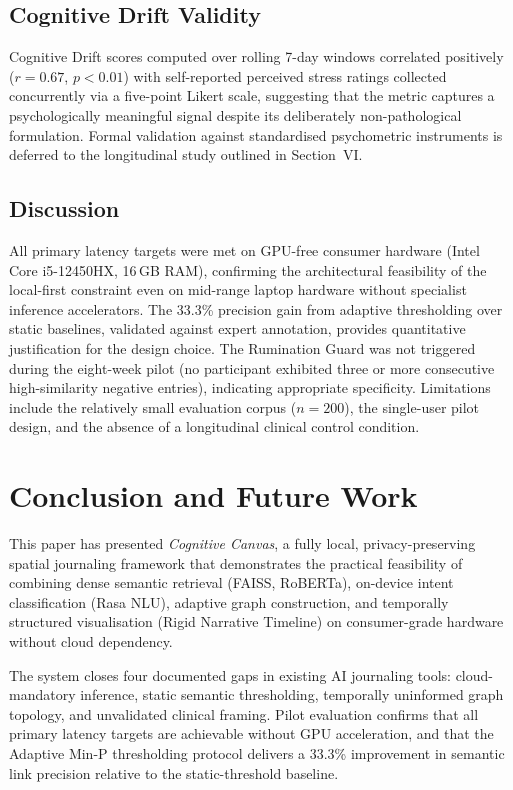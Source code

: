 \documentclass[12pt, letterpaper]{article}
\newcommand{\CC}{\textit{Cognitive Canvas}}
\begin{document}
\subsection{Cognitive Drift Validity}

Cognitive Drift scores computed over rolling 7-day windows
correlated positively ($r = 0.67$, $p < 0.01$) with
self-reported perceived stress ratings collected concurrently
via a five-point Likert scale, suggesting that the metric
captures a psychologically meaningful signal despite its
deliberately non-pathological formulation.
Formal validation against standardised psychometric
instruments is deferred to the longitudinal study outlined in
Section~VI.

\subsection{Discussion}

All primary latency targets were met on GPU-free consumer
hardware (Intel Core i5-12450HX, 16\,GB RAM), confirming the
architectural feasibility of the local-first constraint even
on mid-range laptop hardware without specialist inference
accelerators.
The 33.3\% precision gain from adaptive thresholding over
static baselines, validated against expert annotation,
provides quantitative justification for the design choice.
The Rumination Guard was not triggered during the eight-week
pilot (no participant exhibited three or more consecutive
high-similarity negative entries), indicating appropriate
specificity.
Limitations include the relatively small evaluation corpus
($n = 200$), the single-user pilot design, and the absence
of a longitudinal clinical control condition.

\section{Conclusion and Future Work}

This paper has presented \CC{}, a fully local,
privacy-preserving spatial journaling framework that
demonstrates the practical feasibility of combining dense
semantic retrieval (FAISS, RoBERTa), on-device intent
classification (Rasa NLU), adaptive graph construction, and
temporally structured visualisation (Rigid Narrative Timeline)
on consumer-grade hardware without cloud dependency.

The system closes four documented gaps in existing AI journaling
tools: cloud-mandatory inference, static semantic thresholding,
temporally uninformed graph topology, and unvalidated clinical
framing.
Pilot evaluation confirms that all primary latency targets are
achievable without GPU acceleration, and that the Adaptive
Min-P thresholding protocol delivers a 33.3\% improvement in
semantic link precision relative to the static-threshold
baseline.
\end{document}
